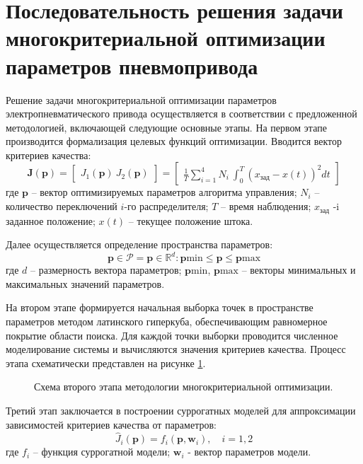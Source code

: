 \section{Последовательность решения задачи многокритериальной оптимизации параметров пневмопривода}\label{ch:ch4/sec1}

Решение задачи многокритериальной оптимизации параметров электропневматического привода осуществляется в соответствии с
предложенной методологией, включающей следующие основные этапы.
На первом этапе производится формализация целевых
функций оптимизации. Вводится вектор критериев качества:
\begin{equation}
\mathbf{J}(\mathbf{p}) = \begin{bmatrix}
J_1(\mathbf{p}) \
J_2(\mathbf{p})
\end{bmatrix} = \begin{bmatrix}
\frac{1}{T}\sum_{i=1}^{4}N_i \
\int_0^T (x_{\text{зад}} - x(t))^2 dt
\end{bmatrix}
\end{equation}
где $\mathbf{p}$ -- вектор оптимизируемых параметров алгоритма управления;
$N_i$ -- количество переключений $i$-го распределителя;
$T$ -- время наблюдения;
$x_{\text{зад}}$ -i заданное положение;
$x(t)$ -- текущее положение штока.

Далее осуществляется определение пространства параметров:
\begin{equation}
\mathbf{p} \in \mathcal{P} = {\mathbf{p} \in \mathbb{R}^d: \mathbf{p}{\text{min}} \leq \mathbf{p} \leq \mathbf{p}{\text{max}}}
\end{equation}
где $d$ -- размерность вектора параметров;
$\mathbf{p}{\text{min}}$, $\mathbf{p}{\text{max}}$ -- векторы минимальных и максимальных значений параметров.

На втором этапе формируется начальная выборка точек в пространстве параметров
методом латинского гиперкуба, обеспечивающим равномерное покрытие области
поиска. Для каждой точки выборки проводится численное моделирование системы и вычисляются значения критериев качества.
Процесс этапа схематически представлен на рисунке \ref{fig:step_2_scheme}.

\begin{figure}[ht]
    \centerfloat{
    \texttt{[image: part4/step\_2\_scheme.pdf]}
    }
    \caption{Схема второго этапа методологии многокритериальной оптимизации.}\label{fig:step_2_scheme}
\end{figure}


Третий этап заключается в построении суррогатных моделей для аппроксимации зависимостей критериев качества от параметров:
\begin{equation}
\hat{J}_i(\mathbf{p}) = f_i(\mathbf{p}, \mathbf{w}_i), \quad i = 1,2
\end{equation}
где $f_i$ -- функция суррогатной модели;
$\mathbf{w}_i$ - вектор параметров модели.

